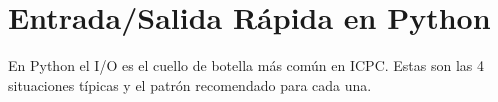 \section{Entrada/Salida Rápida en Python}

En Python el I/O es el cuello de botella más común en ICPC. Estas son las 4 situaciones típicas y el patrón recomendado para cada una.







